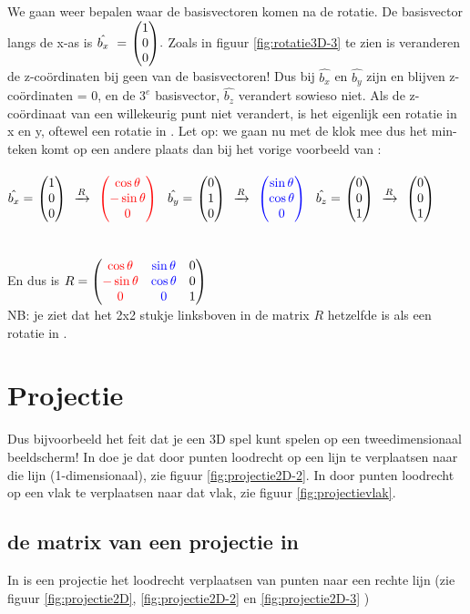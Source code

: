 We gaan weer bepalen waar de basisvectoren komen na de rotatie. De basisvector langs de x-as is $  \hat{b_x} \ = \ \vecdrie{1}{0}{0}. $ Zoals in figuur \ref{fig:rotatie3D-3} te zien is veranderen de z-coördinaten bij geen van de basisvectoren! Dus bij  $ \hat{b_x} $ en $  \hat{b_y} $  zijn en blijven z-coördinaten = 0, en de $ 3^e $ basisvector, $  \hat{b_z} $  verandert sowieso niet. Als de z-coördinaat van een willekeurig punt niet verandert, is het eigenlijk een rotatie in x en y, oftewel een rotatie in \RT.  Let op: we gaan nu met de klok mee dus het min-teken komt op een andere plaats dan bij het vorige voorbeeld van \RT: \\ \\
$ \hat{b_x}  = \ \vecdrie{1}{0}{0}  \ \  \xrightarrow{R} \ \  \vecdrie[red]{\cos \theta}{- \sin \theta}{0}\ $  
\qquad  $ \hat{b_y}  = \ \vecdrie{0}{1}{0}  \ \  \xrightarrow{R}  \ \ \vecdrie[blue]{\sin \theta}{ \cos \theta}{0}\ $  
\qquad  $ \hat{b_z}  = \ \vecdrie{0}{0}{1}   \  \  \xrightarrow{R}  \ \ \vecdrie{0}{0}{1}\ $  \\ \\ \\
En dus is $ R = 
\begin{pmatrix} {\color{red}\cos \theta} & {\color{blue}\sin \theta} & {0}  \\ {\color{red}- \sin \theta} & {\color{blue}\cos \theta} & {0} \\ {\color{red}0} & {\color{blue}0} & {1} \end{pmatrix} $ \\ NB: je ziet dat het 2x2 stukje linksboven in de matrix $ R $ hetzelfde is als  een rotatie in \RT.

\section{Projectie}		
  Dus bijvoorbeeld het feit dat je een 3D spel kunt spelen op een tweedimensionaal beeldscherm! In \RT doe je dat door punten loodrecht op een lijn te verplaatsen naar die lijn (1-dimensionaal), zie figuur \ref{fig:projectie2D-2}. In \RD door punten loodrecht op een vlak te verplaatsen naar dat vlak, zie figuur \ref{fig:projectievlak}.
\subsection{de matrix van een projectie in \RT}
\label{projectie2D}
In \RT is een projectie  het loodrecht verplaatsen van punten   naar een rechte lijn (zie figuur \ref{fig:projectie2D},  \ref{fig:projectie2D-2} en \ref{fig:projectie2D-3} ) \\ 

